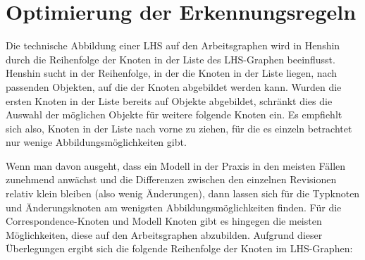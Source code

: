\section{Optimierung der Erkennungsregeln}
\label{optimierung}

Die technische Abbildung einer LHS auf den Arbeitsgraphen wird in Henshin durch die Reihenfolge der
Knoten in der Liste des LHS-Graphen beeinflusst. Henshin sucht in der Reihenfolge, in der die Knoten
in der Liste liegen, nach passenden Objekten, auf die der Knoten abgebildet werden kann. Wurden die
ersten Knoten in der Liste bereits auf Objekte abgebildet, schränkt dies die Auswahl der möglichen
Objekte für weitere folgende Knoten ein. Es empfiehlt sich also, Knoten in der Liste nach vorne zu
ziehen, für die es einzeln betrachtet nur wenige Abbildungsmöglichkeiten gibt.

Wenn man davon ausgeht, dass ein Modell in der Praxis in den meisten Fällen zunehmend anwächst und
die Differenzen zwischen den einzelnen Revisionen relativ klein bleiben (also wenig Änderungen),
dann lassen sich für die Typknoten und Änderungsknoten am wenigsten Abbildungsmöglichkeiten finden.
Für die Correspondence-Knoten und Modell Knoten gibt es hingegen die meisten Möglichkeiten, diese
auf den Arbeitsgraphen abzubilden. Aufgrund dieser Überlegungen ergibt sich die folgende Reihenfolge der
Knoten im LHS-Graphen:

